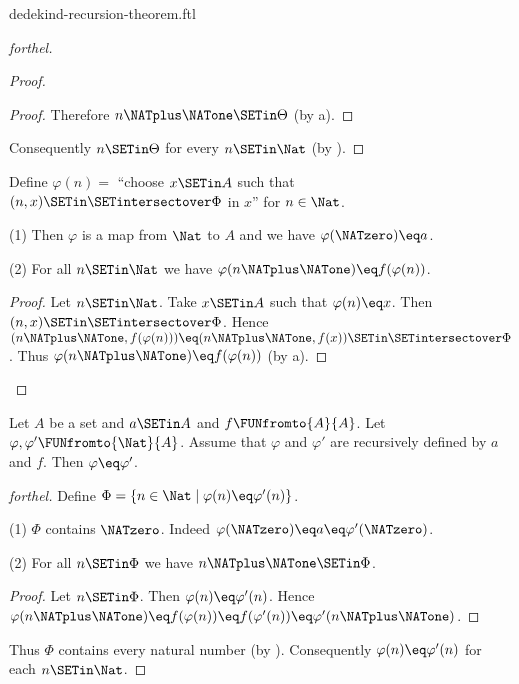 \documentclass{naproche-library}
\begin{document}
\begin{smodule}[title=Dedekind's Recursion Theorem]{dedekind-recursion-theorem.ftl}
\begin{proof}[forthel]
\begin{proof}
\begin{proof}
      Therefore $n \NATplus \NATone \SETin \Theta$ (by a).
    \end{proof}

    Consequently $n \SETin \Theta$ for every $n \SETin \Nat$ (by ).
  \end{proof}

  Define $\varphi(n) =$ ``choose $x \SETin A$ such that $(n, x) \SETin
  \SETintersectover \Phi$ in $x$'' for $n \in \Nat$.

  (1) Then $\varphi$ is a map from $\Nat$ to $A$ and we have
  $\varphi(\NATzero) \eq a$.

  (2) For all $n \SETin \Nat$ we have $\varphi(n \NATplus \NATone) \eq
  f(\varphi(n))$.
  \begin{proof}
    Let $n \SETin \Nat$.
    Take $x \SETin A$ such that $\varphi(n) \eq x$.
    Then $(n, x) \SETin \SETintersectover \Phi$.
    Hence $(n \NATplus \NATone, f(\varphi(n))) \eq (n \NATplus \NATone, f(x)) \SETin \SETintersectover \Phi$.
    Thus $\varphi(n \NATplus \NATone) \eq f(\varphi(n))$ (by a).
  \end{proof}
\end{proof}

\begin{theorem}[forthel,title=Dedekind's Recursion Theorem: Uniqueness,id=dedekind_uniqueness]
  Let $A$ be a set and $a \SETin A$ and $f \FUNfromto{A}{A}$.
  Let $\varphi, \varphi' \FUNfromto{\Nat}{A}$.
  Assume that $\varphi$ and $\varphi'$ are recursively defined by $a$ and
  $f$.
  Then $\varphi \eq \varphi'$.
\end{theorem}
\begin{proof}[forthel]
  Define $\Phi = \{ n \in \Nat \mid \varphi(n) \eq \varphi'(n) \}$.

  (1) $\Phi$ contains $\NATzero$.
  Indeed $\varphi(\NATzero) \eq a \eq \varphi'(\NATzero)$.

  (2) For all $n \SETin \Phi$ we have $n \NATplus \NATone \SETin \Phi$.
  \begin{proof}
    Let $n \SETin \Phi$.
    Then $\varphi(n) \eq \varphi'(n)$.
    Hence $\varphi(n \NATplus \NATone)
      \eq f(\varphi(n))
      \eq f(\varphi'(n))
      \eq \varphi'(n \NATplus \NATone)$.
    \end{proof}

  Thus $\Phi$ contains every natural number (by ).
  Consequently $\varphi(n) \eq \varphi'(n)$ for each $n \SETin \Nat$.
\end{proof}
\end{smodule}
\end{document}
